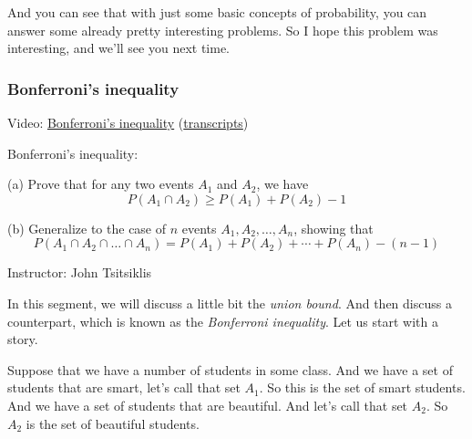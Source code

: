 \documentclass[pdftex, brazil, 12pt, twoside]{article}
\begin{document}
And you can see that with just some basic concepts of
probability, you can answer some already pretty
interesting problems.
So I hope this problem was interesting, and we'll
see you next time.

\subsubsection{Bonferroni's inequality}
\label{un1-solved-bonferroni}

Video: \href{https://www.youtube.com/watch?v=dTPwQEegHxw}{Bonferroni's inequality}
(\href{Unit-1/03\_solved\_problems/sp\_4\_transcripts.pdf}{transcripts})

Bonferroni's inequality:

(a) Prove that for any two events $A_1$ and $A_2$, we have
\begin{equation*}
  P(A_1 \cap A_2) \ge P(A_1) + P(A_2) -1
\end{equation*}

(b) Generalize to the case of $n$ events $A_1, A_2, \ldots, A_n$, showing that
\begin{equation*}
  P(A_1 \cap A_2 \cap \ldots \cap A_n) = P(A_1) + P(A_2) + \cdots + P(A_n) - (n-1)
\end{equation*}

Instructor: John Tsitsiklis 

In this segment, we will discuss a little
bit the \emph{union bound}.
And then discuss a counterpart, which is known as
the \emph{Bonferroni inequality}.
Let us start with a story.

Suppose that we have a number of students in some class.
And we have a set of students that are smart, let's call
that set $A_1$.
So this is the set of smart students.
And we have a set of students that are beautiful.
And let's call that set $A_2$.
So $A_2$ is the set of beautiful students.

\begin{figure}[H]
  \begin{center}
  \end{center}
\end{figure}
\end{document}
